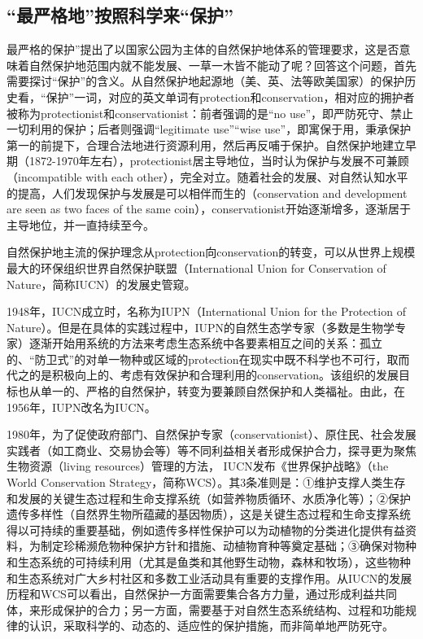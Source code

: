 \documentclass[
]{book}
\begin{document}
\hypertarget{ux6700ux4e25ux683cux5730ux6309ux7167ux79d1ux5b66ux6765ux4fddux62a4}{%
\subsection{``最严格地''按照科学来``保护''}\label{ux6700ux4e25ux683cux5730ux6309ux7167ux79d1ux5b66ux6765ux4fddux62a4}}

最严格的保护''提出了以国家公园为主体的自然保护地体系的管理要求，这是否意味着自然保护地范围内就不能发展、一草一木皆不能动了呢？回答这个问题，首先需要探讨``保护''的含义。从自然保护地起源地（美、英、法等欧美国家）的保护历史看，``保护''一词，对应的英文单词有protection和conservation，相对应的拥护者被称为protectionist和conservationist：前者强调的是``no use''，即严防死守、禁止一切利用的保护；后者则强调``legitimate use''``wise use''，即寓保于用，秉承保护第一的前提下，合理合法地进行资源利用，然后再反哺于保护。自然保护地建立早期（1872-1970年左右），protectionist居主导地位，当时认为保护与发展不可兼顾（incompatible with each other），完全对立。随着社会的发展、对自然认知水平的提高，人们发现保护与发展是可以相伴而生的（conservation and development are seen as two faces of the same coin），conservationist开始逐渐增多，逐渐居于主导地位，并一直持续至今。

自然保护地主流的保护理念从protection向conservation的转变，可以从世界上规模最大的环保组织世界自然保护联盟（International Union for Conservation of Nature，简称IUCN）的发展史管窥。

1948年，IUCN成立时，名称为IUPN（International Union for the Protection of Nature）。但是在具体的实践过程中，IUPN的自然生态学专家（多数是生物学专家）逐渐开始用系统的方法来考虑生态系统中各要素相互之间的关系：孤立的、``防卫式''的对单一物种或区域的protection在现实中既不科学也不可行，取而代之的是积极向上的、考虑有效保护和合理利用的conservation。该组织的发展目标也从单一的、严格的自然保护，转变为要兼顾自然保护和人类福祉。由此，在1956年，IUPN改名为IUCN。

1980年，为了促使政府部门、自然保护专家（conservationist）、原住民、社会发展实践者（如工商业、交易协会等）等不同利益相关者形成保护合力，探寻更为聚焦生物资源（living resources）管理的方法， IUCN发布《世界保护战略》（the World Conservation Strategy，简称WCS）。其3条准则是：①维护支撑人类生存和发展的关键生态过程和生命支撑系统（如营养物质循环、水质净化等）；②保护遗传多样性（自然界生物所蕴藏的基因物质），这是关键生态过程和生命支撑系统得以可持续的重要基础，例如遗传多样性保护可以为动植物的分类进化提供有益资料，为制定珍稀濒危物种保护方针和措施、动植物育种等奠定基础；③确保对物种和生态系统的可持续利用（尤其是鱼类和其他野生动物，森林和牧场），这些物种和生态系统对广大乡村社区和多数工业活动具有重要的支撑作用。从IUCN的发展历程和WCS可以看出，自然保护一方面需要集合各方力量，通过形成利益共同体，来形成保护的合力；另一方面，需要基于对自然生态系统结构、过程和功能规律的认识，采取科学的、动态的、适应性的保护措施，而非简单地严防死守。
\end{document}
